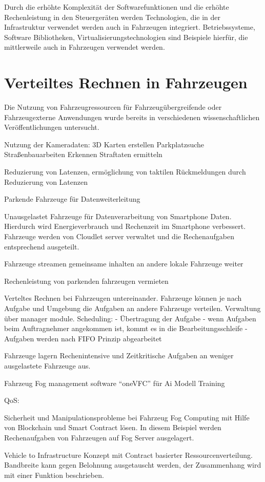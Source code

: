 Durch die erhöhte Komplexität der Softwarefunktionen und die erhöhte Rechenleistung in den Steuergeräten werden Technologien, die in der  Infrastruktur verwendet werden auch in Fahrzeugen integriert. Betriebssysteme, Software Bibliotheken, Virtualisierungstechnologien sind Beispiele hierfür, die mittlerweile auch in Fahrzeugen verwendet werden.

\section{Verteiltes Rechnen in Fahrzeugen}
\label{Verteiltes Rechnen in Fahrzeugen}

Die Nutzung von Fahrzeugressourcen für Fahrzeugübergreifende oder Fahrzeugexterne Anwendungen wurde bereits in verschiedenen wissenschaftlichen Veröffentlichungen untersucht. 

Nutzung der Kameradaten:
 3D Karten erstellen
 Parkplatzsuche
 Straßenbauarbeiten Erkennen
 Straftaten ermitteln \cite{Zhu2018}

Reduzierung von Latenzen, ermöglichung von taktilen Rückmeldungen durch Reduzierung von Latenzen \cite{Mukherjee2020}

Parkende Fahrzeuge für Datenweiterleitung \cite{Malandrino2014} \cite{Liu2011}

Unausgelastet Fahrzeuge für Datenverarbeitung von Smartphone Daten. Hierdurch wird Energieverbrauch und Rechenzeit im Smartphone verbessert. Fahrzeuge werden von Cloudlet server verwaltet und die Rechenaufgaben entsprechend ausgeteilt. \cite{Zhang2015}

Fahrzeuge streamen gemeinsame inhalten an andere lokale Fahrzeuge weiter \cite{Kharel2019}

Rechenleistung von parkenden fahrzeugen vermieten\cite{Arif2012}

Verteltes Rechnen bei Fahrzeugen untereinander. Fahrzeuge können je nach Aufgabe und Umgebung die Aufgaben an andere Fahrzeuge verteilen. Verwaltung über manager module. 
Scheduling:
	- Übertragung der Aufgabe
	- wenn Aufgaben beim Auftragnehmer angekommen ist, kommt es in die Bearbeitungsschleife
	- Aufgaben werden nach FIFO Prinzip abgearbeitet\cite{Feng2017}

Fahrzeuge lagern Rechenintensive und Zeitkritische Aufgaben an weniger ausgelastete Fahrzeuge aus. \cite{Liao2019} \cite{Wu2020}


Fahrzeug Fog management software \enquote{oneVFC} für Ai Modell Training \cite{Phung2021}

QoS:

Sicherheit und Manipulationsprobleme bei Fahrzeug Fog Computing mit Hilfe von Blockchain und Smart Contract lösen. In diesem Beispiel werden Rechenaufgaben von Fahrzeugen auf Fog Server ausgelagert.\cite{Liao2021}

Vehicle to Infrastructure Konzept mit Contract basierter Ressourcenverteilung. Bandbreite kann gegen Belohnung ausgetauscht werden, der Zusammenhang wird mit einer Funktion beschrieben.\cite{Zhao2020}




